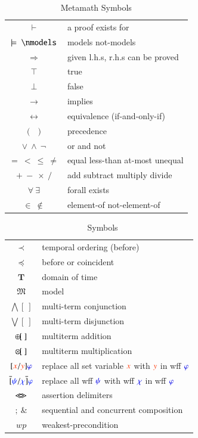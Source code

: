 \begin{table}[htp]
\caption{Metamath Symbols}
\begin{center}
\begin{tabular}{|c l|}
\hline
$\vdash$ & a proof exists for \\
$\models~\nmodels$ & models not-models\\
$\Rightarrow$ & given l.h.s, r.h.s can be proved\\
$\top$ & true \\
$\bot$ & false \\
$\rightarrow$ & implies  \\
$\leftrightarrow$ & equivalence (if-and-only-if) \\
$(~~)$ & precedence \\
$\vee~\wedge~\lnot$ &  or and not \\
$=~<~\le~\ne $  & equal less-than at-most unequal\\
$+~\minus~\times~/$ & add subtract multiply divide \\
$\forall~\exists$ & forall exists\\
$\in~\notin$ & element-of not-element-of\\
\hline
\end{tabular}
\end{center}
\label{tab:sym}
\end{table}%

\begin{table}[htp]
\caption{\logicid~ Symbols}
\begin{center}
\begin{tabular}{|c l|}
\hline
$\prec$ & temporal ordering (before) \\
$\preccurlyeq$ & before or coincident \\
$\mathbf{T}$ & domain of time \\
$\mathfrak{M}$ & model \\
$\bigwedge[~]$ & multi-term conjunction \\
$\bigvee[~]$ & multi-term disjunction \\
$\oplus\hspace{-1pt}[~]$ & multiterm addition \\
$\otimes\hspace{-1pt}[~]$ & multiterm multiplication \\
$[\msc{x} / \msc{y} ] \mw{\varphi} $ & replace all set variable $\msc{x}$ with $\msc{y}$ in wff $\mw{\varphi}$ \\
$\overline{[} {\color{formulacolor}\psi} / {\color{formulacolor}\chi} \overline{]} {\color{formulacolor}\varphi} $ & replace all wff $\mw{\psi}$ with wff $\mw{\chi}$ in wff $\mw{\varphi}$ \\
$\ll\!\!~\!\!\gg$ & assertion delimiters \\
$;~\&$ & sequential and concurrent composition \\
$wp$ & weakest-precondition \\
\hline
\end{tabular}
\end{center}
\label{tab:blesssym}
\end{table}%

